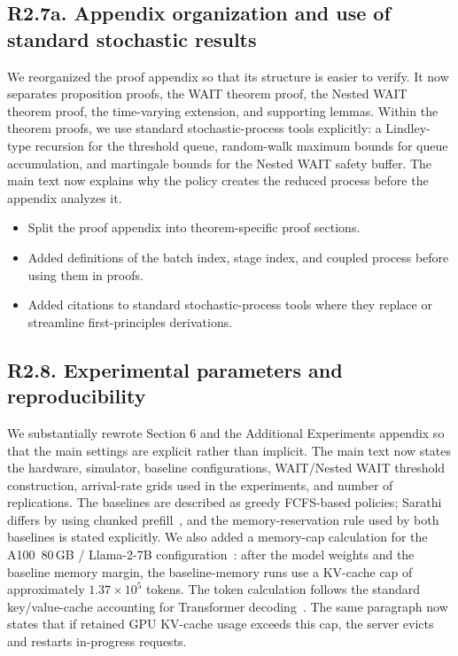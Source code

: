 \subsection*{R2.7a. Appendix organization and use of standard stochastic results}


\response We reorganized the proof appendix so that its structure is easier to verify. It now separates proposition proofs, the WAIT theorem proof, the Nested WAIT theorem proof, the time-varying extension, and supporting lemmas. Within the theorem proofs, we use standard stochastic-process tools explicitly: a Lindley-type recursion for the threshold queue, random-walk maximum bounds for queue accumulation, and martingale bounds for the Nested WAIT safety buffer. The main text now explains why the policy creates the reduced process before the appendix analyzes it.

\changes
\begin{itemize}
    \item Split the proof appendix into theorem-specific proof sections.
    \item Added definitions of the batch index, stage index, and coupled process before using them in proofs.
    \item Added citations to standard stochastic-process tools where they replace or streamline first-principles derivations.
\end{itemize}

\subsection*{R2.8. Experimental parameters and reproducibility}


\response We substantially rewrote Section 6 and the Additional Experiments appendix so that the main settings are explicit rather than implicit. The main text now states the hardware, simulator, baseline configurations, WAIT/Nested WAIT threshold construction, arrival-rate grids used in the experiments, and number of replications. The baselines are described as greedy FCFS-based policies; Sarathi differs by using chunked prefill~\citep{agrawal2023sarathi}, and the memory-reservation rule used by both baselines is stated explicitly. We also added a memory-cap calculation for the A100~80\,GB / Llama-2-7B configuration~\citep{nvidia-a100-specs,huggingface-llama2-docs}: after the model weights and the baseline memory margin, the baseline-memory runs use a KV-cache cap of approximately \(1.37\times 10^5\) tokens. The token calculation follows the standard key/value-cache accounting for Transformer decoding~\citep{huggingface-kv-cache-basics}. The same paragraph now states that if retained GPU KV-cache usage exceeds this cap, the server evicts and restarts in-progress requests.

